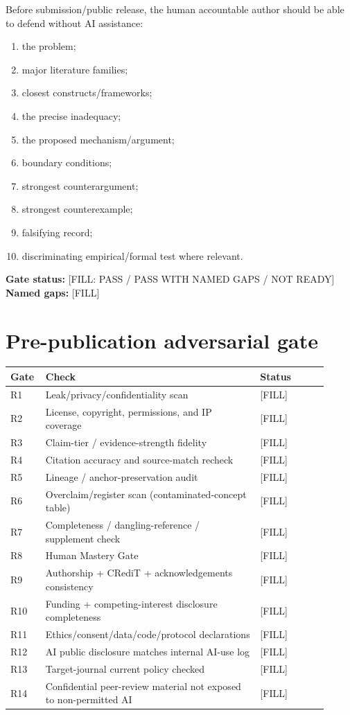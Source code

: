 \documentclass[11pt]{article}
\begin{document}
Before submission/public release, the human accountable author should be able
to defend without AI assistance:
\begin{enumerate}
  \item the problem;
  \item major literature families;
  \item closest constructs/frameworks;
  \item the precise inadequacy;
  \item the proposed mechanism/argument;
  \item boundary conditions;
  \item strongest counterargument;
  \item strongest counterexample;
  \item falsifying record;
  \item discriminating empirical/formal test where relevant.
\end{enumerate}

\noindent\textbf{Gate status:} [FILL: PASS / PASS WITH NAMED GAPS / NOT READY]\\
\textbf{Named gaps:} [FILL]

\section{Pre-publication adversarial gate}
\label{app:publish-gate}

\begin{tabularx}{\linewidth}{@{}p{0.08\linewidth}p{0.63\linewidth}p{0.20\linewidth}@{}}
\toprule
Gate & Check & Status\\
\midrule
R1 & Leak/privacy/confidentiality scan & [FILL]\\
R2 & License, copyright, permissions, and IP coverage & [FILL]\\
R3 & Claim-tier / evidence-strength fidelity & [FILL]\\
R4 & Citation accuracy and source-match recheck & [FILL]\\
R5 & Lineage / anchor-preservation audit & [FILL]\\
R6 & Overclaim/register scan (contaminated-concept table) & [FILL]\\
R7 & Completeness / dangling-reference / supplement check & [FILL]\\
R8 & Human Mastery Gate & [FILL]\\
R9 & Authorship + CRediT + acknowledgements consistency & [FILL]\\
R10 & Funding + competing-interest disclosure completeness & [FILL]\\
R11 & Ethics/consent/data/code/protocol declarations & [FILL]\\
R12 & AI public disclosure matches internal AI-use log & [FILL]\\
R13 & Target-journal current policy checked & [FILL]\\
R14 & Confidential peer-review material not exposed to non-permitted AI & [FILL]\\
\bottomrule
\end{tabularx}
\end{document}
